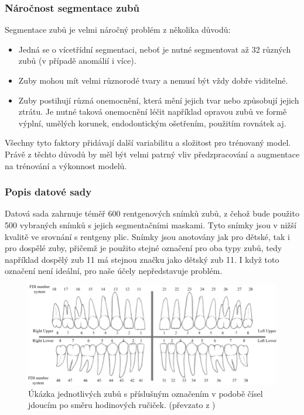 \documentclass[male,czech,api_ing]{thesis}
\begin{document}
\subsubsection{Náročnost segmentace zubů}
Segmentace zubů je velmi náročný problém z několika důvodů:

\begin{itemize}
    \item Jedná se o vícetřídní segmentaci, neboť je nutné segmentovat až 32 různých zubů (v případě anomálií i více).
    \item Zuby mohou mít velmi různorodé tvary a nemusí být vždy dobře viditelné.
    \item Zuby postihují různá onemocnění, která mění jejich tvar nebo způsobují jejich ztrátu. Je nutné taková onemocnění léčit například opravou zubů ve formě výplní, umělých korunek, endodontickým ošetřením, použitím rovnátek aj.
\end{itemize}

Všechny tyto faktory přidávají další variabilitu a složitost pro trénovaný model. Právě z těchto důvodů by měl být velmi patrný vliv předzpracování a augmentace na trénování a výkonnost modelů.

\subsubsection{Popis datové sady}
Datová sada zahrnuje téměř 600 rentgenových snímků zubů, z čehož bude použito 500 vybraných snímků s jejich segmentačními maskami. Tyto snímky jsou v nižší kvalitě ve srovnání s rentgeny plic. Snímky jsou anotovány jak pro dětské, tak i pro dospělé zuby, přičemž je použito stejné označení pro oba typy zubů, tedy například dospělý zub 11 má stejnou značku jako dětský zub 11. I když toto označení není ideální, pro naše účely nepředstavuje problém.

\begin{figure}[ht]
    \centering
    \includegraphics[width=\linewidth]{Prilohy/Obrazky/FDITeethLabels.png}
    \caption{Úkázka jednotlivých zubů s příslušným označením v podobě čísel jdoucím po směru hodinových ručiček. (převzato z \cite{teethLabelImg})}
    \label{fig:teethLabel}
\end{figure}
\end{document}
